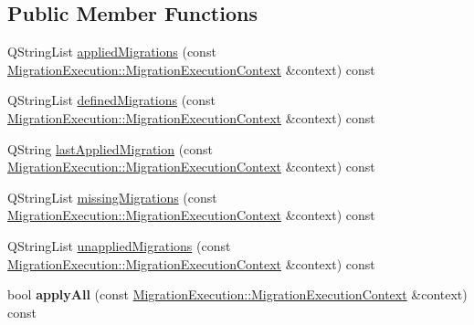 \subsection*{Public Member Functions}
\begin{DoxyCompactItemize}
\item 
Q\+String\+List \hyperlink{class_q_sql_migrator_1_1_q_sql_migrator_service_afb783f872cf79f4264031d202d262465}{applied\+Migrations} (const \hyperlink{class_q_sql_migrator_1_1_migration_execution_1_1_migration_execution_context}{Migration\+Execution\+::\+Migration\+Execution\+Context} \&context) const
\item 
Q\+String\+List \hyperlink{class_q_sql_migrator_1_1_q_sql_migrator_service_a95540ad297027ab2d746d5d67a42f51a}{defined\+Migrations} (const \hyperlink{class_q_sql_migrator_1_1_migration_execution_1_1_migration_execution_context}{Migration\+Execution\+::\+Migration\+Execution\+Context} \&context) const
\item 
Q\+String \hyperlink{class_q_sql_migrator_1_1_q_sql_migrator_service_ab260bfc218f0a6c58eae3c261c6ea462}{last\+Applied\+Migration} (const \hyperlink{class_q_sql_migrator_1_1_migration_execution_1_1_migration_execution_context}{Migration\+Execution\+::\+Migration\+Execution\+Context} \&context) const
\item 
Q\+String\+List \hyperlink{class_q_sql_migrator_1_1_q_sql_migrator_service_a9d643749c3e565e02532854c2ff35971}{missing\+Migrations} (const \hyperlink{class_q_sql_migrator_1_1_migration_execution_1_1_migration_execution_context}{Migration\+Execution\+::\+Migration\+Execution\+Context} \&context) const
\item 
Q\+String\+List \hyperlink{class_q_sql_migrator_1_1_q_sql_migrator_service_a438604359cb3fca6636b395976eb2f3c}{unapplied\+Migrations} (const \hyperlink{class_q_sql_migrator_1_1_migration_execution_1_1_migration_execution_context}{Migration\+Execution\+::\+Migration\+Execution\+Context} \&context) const
\item 
\mbox{\label{class_q_sql_migrator_1_1_q_sql_migrator_service_a446c653987b60f8091314064b7cc1f5e}} 
bool {\bfseries apply\+All} (const \hyperlink{class_q_sql_migrator_1_1_migration_execution_1_1_migration_execution_context}{Migration\+Execution\+::\+Migration\+Execution\+Context} \&context) const
\item 
\mbox{\label{class_q_sql_migrator_1_1_q_sql_migrator_service_a969ccc646b9b930ac9ca59f29e12c18f}} 

\end{DoxyCompactItemize}
